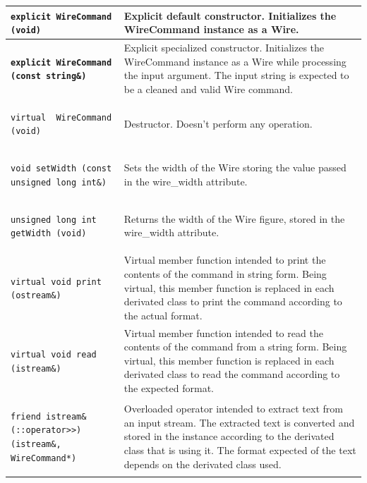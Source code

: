 \documentclass[11pt,twoside,openany,x11names,svgnames]{memoir}
\begin{document}
\begin{table}[h]\footnotesize
\centering
\begin{tabular}{| >{\bfseries}p{7.5cm} | p{8cm} |}
	\hline
	
	\texttt{explicit WireCommand (void)} & Explicit default constructor. Initializes the WireCommand instance as a Wire. \\
	
	\hline
	
	\texttt{explicit WireCommand (const string\&)} & Explicit specialized constructor. Initializes the WireCommand instance as a Wire while processing the input argument. The input string is expected to be a cleaned and valid Wire command. \\
	
	\hline
	
	\texttt{virtual ~WireCommand (void)} & Destructor. Doesn't perform any operation. \\
	
	\hline
	
	\texttt{void setWidth (const unsigned long int\&)} & Sets the width of the Wire storing the value passed in the wire\_width attribute. \\
	
	\hline	
	
	\texttt{unsigned long int getWidth (void)} & Returns the width of the Wire figure, stored in the wire\_width attribute. \\
	
	\hline	
	
	\texttt{virtual void print (ostream\&)} & Virtual member function intended to print the contents of the command in string form. Being virtual, this member function is replaced in each derivated class to print the command according to the actual format. \\
	
	\hline
	
	\texttt{virtual void read (istream\&)} & Virtual member function intended to read the contents of the command from a string form. Being virtual, this member function is replaced in each derivated class to read the command according to the expected format. \\
	
	\hline	
		
	\texttt{friend istream\& (::operator>>) (istream\&, WireCommand*)} & Overloaded operator intended to extract text from an input stream. The extracted text is converted and stored in the instance according to the derivated class that is using it. The format expected of the text depends on the derivated class used. \\
	

\end{tabular}
\end{table}
\end{document}
